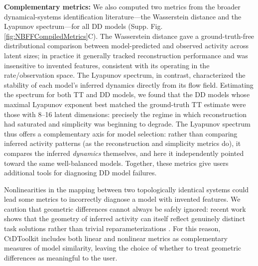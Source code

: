 \documentclass{article}
\begin{document}
\textbf{Complementary metrics:} We also computed two metrics from the broader dynamical-systems identification literature—the Wasserstein distance and the Lyapunov spectrum—for all DD models (Supp. Fig. \ref{fig:NBFFCompiledMetrics}C). The Wasserstein distance gave a ground-truth-free distributional comparison between model-predicted and observed activity across latent sizes; in practice it generally tracked reconstruction performance and was insensitive to invented features, consistent with its operating in the rate/observation space. The Lyapunov spectrum, in contrast, characterized the stability of each model's inferred dynamics directly from its flow field. Estimating the spectrum for both TT and DD models, we found that the DD models whose maximal Lyapunov exponent best matched the ground-truth TT estimate were those with 8--16 latent dimensions: precisely the regime in which reconstruction had saturated and simplicity was beginning to degrade. The Lyapunov spectrum thus offers a complementary axis for model selection: rather than comparing inferred activity patterns (as the reconstruction and simplicity metrics do), it compares the inferred \emph{dynamics} themselves, and here it independently pointed toward the same well-balanced models. Together, these metrics give users additional tools for diagnosing DD model failures.

Nonlinearities in the mapping between two topologically identical systems could lead some metrics to incorrectly diagnose a model with invented features. We caution that geometric differences cannot always be safely ignored: recent work shows that the geometry of inferred activity can itself reflect genuinely distinct task solutions rather than trivial reparameterizations \cite{tolmachev2025single}. For this reason, CtDToolkit includes both linear and nonlinear metrics as complementary measures of model similarity, leaving the choice of whether to treat geometric differences as meaningful to the user.
\end{document}
